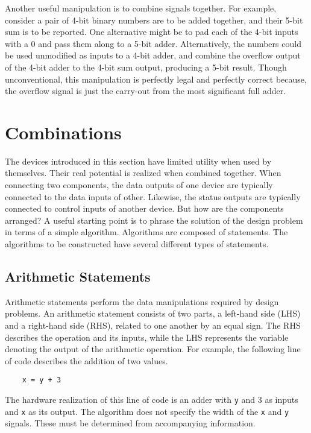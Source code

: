    Another useful manipulation is to combine signals together.  For
    example, consider a pair of 4-bit binary numbers
    are to be added together, and their 5-bit sum is to be reported.
    One alternative might be to pad each of the 4-bit inputs with a 0 and
    pass them along to a 5-bit adder.  Alternatively,
    the numbers could be used unmodified as inputs to a 4-bit adder,
    and combine the overflow output
    of the 4-bit adder to the 4-bit sum output, producing a 5-bit result.
    Though unconventional, this manipulation is perfectly legal and perfectly
    correct because, the overflow signal is just the
    carry-out from the most significant full adder.


\section{Combinations}
The devices introduced in this section have limited utility when
used by themselves. Their real potential is realized when combined together.
When connecting two components, the data
outputs of one device are typically connected to the data inputs
of other.  Likewise, the status outputs are typically connected
to control inputs of another device.  But how are the components arranged?
A useful starting point is to phrase the solution
of the design problem in terms of a simple algorithm.  Algorithms
are composed of statements. The algorithms to be constructed
have several different types of statements.

\subsection{Arithmetic Statements}
Arithmetic statements perform the data manipulations required by
design problems.  An arithmetic statement consists of two parts,
a left-hand side (LHS) and a right-hand side (RHS), related to one
another by an equal sign.  The RHS describes the operation and its
inputs, while the LHS represents the variable denoting the output
of the arithmetic operation.  For example, the following line of
code describes the addition of two values.

\begin{verbatim}
    x = y + 3
\end{verbatim}

The hardware realization of this line of code is an adder with \verb+y+
and 3 as inputs and \verb+x+ as its output.  The algorithm does not
specify the width of the \verb+x+ and \verb+y+ signals. These must
be determined from accompanying information.

